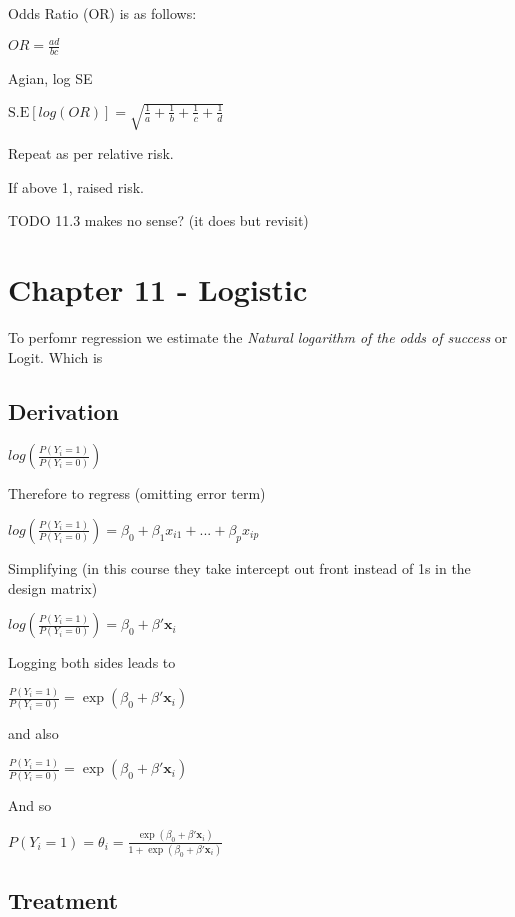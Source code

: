 \documentclass[
  letterpaper,
  DIV=11,
  numbers=noendperiod]{scrreprt}
\begin{document}
Odds Ratio (OR) is as follows:

\(OR = \frac{ad}{bc}\)

Agian, log SE

\(\text{S.E}[log(OR)] = \sqrt{  \frac{1}{a} +  \frac{1}{b}+  \frac{1}{c}+  \frac{1}{d} }\)

Repeat as per relative risk.

If above 1, raised risk.

TODO 11.3 makes no sense? (it does but revisit)


\hypertarget{chapter-11---logistic}{%
\chapter{Chapter 11 - Logistic}\label{chapter-11---logistic}}

To perfomr regression we estimate the \emph{Natural logarithm of the
odds of success} or Logit. Which is

\hypertarget{derivation}{%
\section{Derivation}\label{derivation}}

\(log(\frac{P(Y_i = 1)}{P(Y_i = 0)})\)

Therefore to regress (omitting error term)

\(log(\frac{P(Y_i = 1)}{P(Y_i = 0)}) = \beta_0 + \beta_1x_{i1} + ... + \beta_px_{ip}\)

Simplifying (in this course they take intercept out front instead of 1s
in the design matrix)

\(log(\frac{P(Y_i = 1)}{P(Y_i = 0)}) = \beta_0 + \beta'\mathbf{x}_i\)

Logging both sides leads to

\(\frac{P(Y_i = 1)}{P(Y_i = 0)} = \exp(\beta_0 + \beta'\mathbf{x}_i)\)

and also

\(\frac{P(Y_i = 1)}{P(Y_i = 0)} = \exp(\beta_0 + \beta'\mathbf{x}_i)\)

And so

\(P(Y_i = 1)= \theta_i = \frac{\exp(\beta_0 + \beta'\mathbf{x}_i)}{1+\exp(\beta_0 + \beta'\mathbf{x}_i)}\)

\hypertarget{treatment}{%
\section{Treatment}\label{treatment}}
\end{document}
